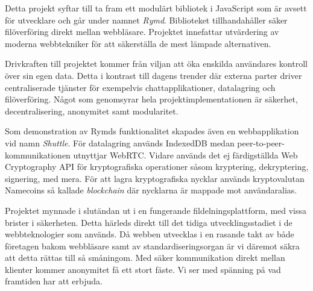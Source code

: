 Detta projekt syftar till ta fram ett modulärt bibliotek i JavaScript som är avsett för utvecklare och går under namnet \emph{Rymd}. Biblioteket tillhandahåller säker filöverföring direkt mellan webbläsare. Projektet innefattar utvärdering av moderna webbtekniker för att säkerställa de mest lämpade alternativen.

Drivkraften till projektet kommer från viljan att öka enskilda användares kontroll över sin egen data. Detta i kontrast till dagens trender där externa parter driver centraliserade tjänster för exempelvis chattapplikationer, datalagring och filöverföring. Något som genomsyrar hela projektimplementationen är säkerhet, decentralisering, anonymitet samt modularitet. 

Som demonstration av Rymds funktionalitet skapades även en webbapplikation vid namn \emph{Shuttle}. För datalagring används IndexedDB medan peer-to-peer-kommunikationen utnyttjar WebRTC. Vidare används det ej färdigställda Web Cryptography API för kryptografiska operationer såsom kryptering, dekryptering, signering, med mera. För att lagra kryptografiska nycklar används kryptovalutan Namecoins så kallade \emph{blockchain} där nycklarna är mappade mot användaralias.

Projektet mynnade i slutändan ut i en fungerande fildelningsplattform, med vissa brister i säkerheten. Detta härleds direkt till det tidiga utvecklingsstadiet i de webbteknologier som används. Då webben utvecklas i en rasande takt av både företagen bakom webbläsare samt av standardiseringsorgan är vi däremot säkra att detta rättas till så småningom. Med säker kommunikation direkt mellan klienter kommer anonymitet få ett stort fäste. Vi ser med spänning på vad framtiden har att erbjuda.
